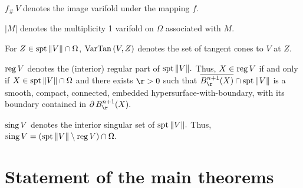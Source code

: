 \documentclass[a4paper,11pt]{amsart}
\begin{document}
$f_{\#} \, V$ denotes the image varifold under the mapping $f.$ 

$|M|$ denotes the multiplicity 1 varifold on $\Omega$ associated with $M$.

For $Z \in {\rm spt} \, \|V\| \cap \Omega$, ${\rm VarTan} \, (V, Z)$ denotes the set of tangent cones to $V$ at $Z$.

 
 ${\rm reg} \, V$ denotes the (interior) regular part of 
${\rm spt} \, \|V\|.$ Thus, $X \in {\rm reg} \,V$ if and only if $X \in {\rm spt} \, \|V\| \cap \Omega$ and there exists $\r >0$ such that $\overline{B^{n+1}_{\r}(X)} \cap {\rm spt} \, \|V\|$ is a smooth, compact, connected, embedded hypersurface-with-boundary, with its boundary contained in $\partial \, B^{n+1}_{\r}(X).$

${\rm sing} \, V$ denotes the interior singular set of ${\rm spt} \, \|V\|.$ Thus, 
${\rm sing} \, V = ({\rm spt} \, \|V\| \setminus {\rm reg} \, V) \cap \Omega.$


\section{Statement of the main theorems}\label{maintheorems}
\end{document}
